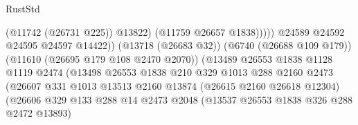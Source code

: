 \begin{lexlean}{RustStd}
\begin{coremodule}
                                                              (@11742 (@26731 @225))
                                                              @13822)
                                                            (@11759 @26657 @1838)))))
                                                    @24589
                                                    @24592
                                                    @24595
                                                    @24597
                                                    @14422))
                                                (@13718 (@26683 @32))
                                                (@6740 (@26688 @109 @179))
                                                (@11610 (@26695 @179 @108 @2470 @2070))
                                                (@13489
                                                  @26553
                                                  @1838
                                                  @1128
                                                  @1119
                                                  @2474
                                                  (@13498
                                                    @26553
                                                    @1838
                                                    @210
                                                    @329
                                                    @1013
                                                    @288
                                                    @2160
                                                    @2473
                                                    (@26607
                                                      @331
                                                      @1013
                                                      @13513
                                                      @2160
                                                      @13874
                                                      (@26615 @2160 @26618 @12304)
                                                      (@26606
                                                        @329
                                                        @133
                                                        @288
                                                        @14
                                                        @2473
                                                        @2048
                                                        (@13537 @26553 @1838 @326 @288 @2472 @13893)

\end{coremodule}
\end{lexlean}
